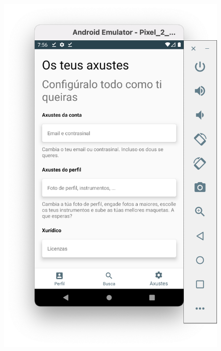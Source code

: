\documentclass[a4paper,12pt]{article}
\begin{document}
\begin{figure}[H]
	\centering
	\includegraphics[scale=.42]{5.png}
\end{figure}
\end{document}
